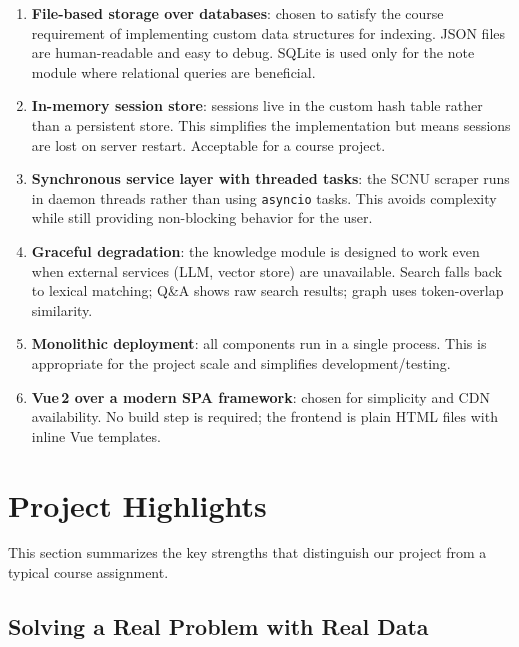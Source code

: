 \documentclass[12pt,a4paper]{article}
\begin{document}
\begin{enumerate}
    \item \textbf{File-based storage over databases}: chosen to satisfy the course requirement of implementing custom data structures for indexing. JSON files are human-readable and easy to debug. SQLite is used only for the note module where relational queries are beneficial.

    \item \textbf{In-memory session store}: sessions live in the custom hash table rather than a persistent store. This simplifies the implementation but means sessions are lost on server restart. Acceptable for a course project.

    \item \textbf{Synchronous service layer with threaded tasks}: the SCNU scraper runs in daemon threads rather than using \texttt{asyncio} tasks. This avoids complexity while still providing non-blocking behavior for the user.

    \item \textbf{Graceful degradation}: the knowledge module is designed to work even when external services (LLM, vector store) are unavailable. Search falls back to lexical matching; Q\&A shows raw search results; graph uses token-overlap similarity.

    \item \textbf{Monolithic deployment}: all components run in a single process. This is appropriate for the project scale and simplifies development/testing.

    \item \textbf{Vue\,2 over a modern SPA framework}: chosen for simplicity and CDN availability. No build step is required; the frontend is plain HTML files with inline Vue templates.
\end{enumerate}

\section{Project Highlights}
\label{sec:highlights}

This section summarizes the key strengths that distinguish our project from a typical course assignment.

\subsection{Solving a Real Problem with Real Data}
\end{document}
